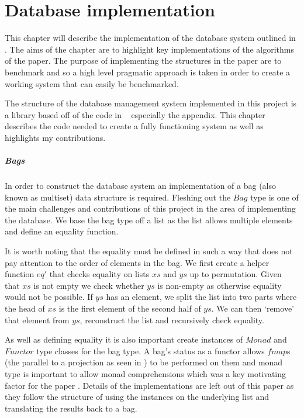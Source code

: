 \chapter{Database implementation}\label{chap:database}
This chapter will describe the implementation of the database system outlined in
\relalg{}. The aims of the chapter are to highlight key implementations of the
algorithms of the paper. The purpose of implementing the structures in the paper
are to benchmark and so a high level pragmatic approach is taken in order to
create a working system that can easily be benchmarked.

The structure of the database management system implemented in this
project is a library based off of the code in
\relalg{}~\cite{RelationalAlgebraByWayOfAdjunctions} especially the appendix.
This chapter describes the code needed to create a fully functioning
system as well as highlights my contributions.

\paragraph{Bags} In order to construct the database system an
implementation of a bag (also known as multiset) data structure is
required. Fleshing out the $Bag$ type is one of the main challenges and
contributions of this project in the area of implementing the database. We
base the bag type off a list as the list allows multiple elements and
define an equality function.



\noindent
It is worth noting that the equality must be defined in such a way that does not
pay attention to the order of elements in the bag. We first create a helper
function $eq'$ that checks equality on lists $xs$ and $ys$ up to permutation.
Given that $xs$ is not empty we check whether $ys$ is non-empty as otherwise
equality would not be possible. If $ys$ has an element, we split the list into
two parts where the head of $xs$ is the first element of the second half of
$ys$. We can then `remove' that element from $ys$, reconstruct the list and
recursively check equality.

As well as defining equality it is also important create instances of $Monad$ and
$Functor$ type classes for the bag type. A bag's status as a functor allows $fmap$s
(the parallel to a projection as seen in ) to be performed on
them and monad type is important to allow monad comprehensions which was a key
motivating factor for the paper \relalg{}. Details of the implementations are
left out of this paper as they follow the structure of using the instances on
the underlying list and translating the results back to a bag.
